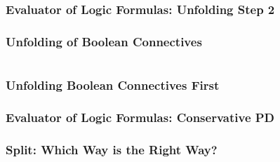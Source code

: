 \documentclass[xcolor=table]{beamer}
\begin{document}
\begin{frame}[fragile]
  \frametitle{Evaluator of Logic Formulas: Unfolding Step 2}

\begin{center}
  
\end{center}
\end{frame}

\begin{frame}[fragile]
  \frametitle{Unfolding of Boolean Connectives}

  \begin{center}
    
  \end{center}

  \vspace{1cm}

  \begin{columns}
    \begin{column}{0.5\textwidth}
      \begin{center}
        
      \end{center}
    \end{column}
    \begin{column}{0.5\textwidth}
      \begin{center}
        
      \end{center}
    \end{column}
  \end{columns}
\end{frame}


\begin{frame}[fragile]
  \frametitle{Unfolding Boolean Connectives First}

\begin{center}
  
\end{center}
\end{frame}

\begin{frame}[fragile]
  \frametitle{Evaluator of Logic Formulas: Conservative PD}

\begin{center}
  
\end{center}
\end{frame}

\begin{frame}[fragile]
  \frametitle{Split: Which Way is the Right Way?}

\end{frame}
\end{document}
